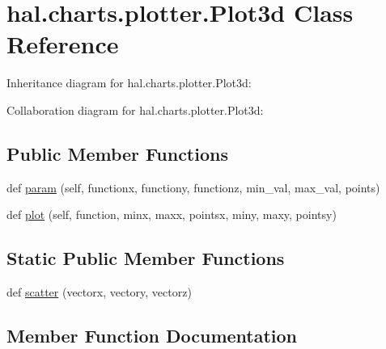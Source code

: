 \hypertarget{classhal_1_1charts_1_1plotter_1_1_plot3d}{}\section{hal.\+charts.\+plotter.\+Plot3d Class Reference}
\label{classhal_1_1charts_1_1plotter_1_1_plot3d}


Inheritance diagram for hal.\+charts.\+plotter.\+Plot3d\+:


Collaboration diagram for hal.\+charts.\+plotter.\+Plot3d\+:
\subsection*{Public Member Functions}
\begin{DoxyCompactItemize}
\item 
def \hyperlink{classhal_1_1charts_1_1plotter_1_1_plot3d_aae25a70d7f0dc2a9161cd360506498a9}{param} (self, functionx, functiony, functionz, min\+\_\+val, max\+\_\+val, points)
\item 
def \hyperlink{classhal_1_1charts_1_1plotter_1_1_plot3d_a56f281f0b9fb9a0f37247c5a0f4791df}{plot} (self, function, minx, maxx, pointsx, miny, maxy, pointsy)
\end{DoxyCompactItemize}
\subsection*{Static Public Member Functions}
\begin{DoxyCompactItemize}
\item 
def \hyperlink{classhal_1_1charts_1_1plotter_1_1_plot3d_a70697dd4170ed79cf48d0835b8e38a29}{scatter} (vectorx, vectory, vectorz)
\end{DoxyCompactItemize}


\subsection{Member Function Documentation}
